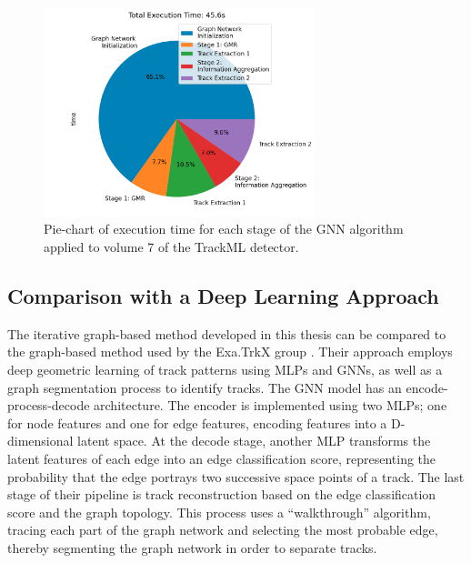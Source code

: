 \begin{figure}[htbp]
    \centering
    \includegraphics[width=0.7\textwidth]{images/7-results/execution-time-endcap-1.png}
    \caption{Pie-chart of execution time for each stage of the GNN algorithm applied to volume 7 of the TrackML detector.}
    \label{fig:execution-time-endcap-1}%
\end{figure}









\subsection{Comparison with a Deep Learning Approach}

The iterative graph-based method developed in this thesis can be compared to the graph-based method used by the Exa.TrkX group \cite{Caillou:2815578}. Their approach employs deep geometric learning of track patterns using MLPs and GNNs, as well as a graph segmentation process to identify tracks. The GNN model has an encode-process-decode architecture. The encoder is implemented using two MLPs; one for node features and one for edge features, encoding features into a D-dimensional latent space. At the decode stage, another MLP transforms the latent features of each edge into an edge classification score, representing the probability that the edge portrays two successive space points of a track. The last stage of their pipeline is track reconstruction based on the edge classification score and the graph topology. This process uses a “walkthrough” algorithm, tracing each part of the graph network and selecting the most probable edge, thereby segmenting the graph network in order to separate tracks.

